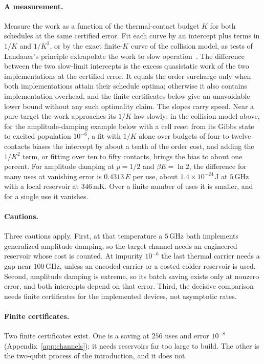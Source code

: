 \paragraph{A measurement.} Measure the work as a function of the thermal-contact budget $K$ for both schedules at the same certified error. Fit each curve by an intercept plus terms in $1/K$ and $1/K^2$, or by the exact finite-$K$ curve of the collision model, as tests of Landauer's principle extrapolate the work to slow operation~\cite{Berut12,Jun14}. The difference between the two slow-limit intercepts is the excess quasistatic work of the two implementations at the certified error. It equals the order surcharge only when both implementations attain their schedule optima; otherwise it also contains implementation overhead, and the finite certificates below give an unavoidable lower bound without any such optimality claim. The slopes carry speed. Near a pure target the work approaches its $1/K$ law slowly: in the collision model above, for the amplitude-damping example below with a cell reset from its Gibbs state to excited population $10^{-6}$, a fit with $1/K$ alone over budgets of four to twelve contacts biases the intercept by about a tenth of the order cost, and adding the $1/K^2$ term, or fitting over ten to fifty contacts, brings the bias to about one percent. For amplitude damping at $p=1/2$ and $\beta E=\ln2$, the difference for many uses at vanishing error is $0.4313\,E$ per use, about $1.4\times10^{-24}$\,J at $5$\,GHz with a local reservoir at $346$\,mK. Over a finite number of uses it is smaller, and for a single use it vanishes.

\paragraph{Cautions.} Three cautions apply. First, at that temperature a $5$\,GHz bath implements generalized amplitude damping, so the target channel needs an engineered reservoir whose cost is counted. At impurity $10^{-6}$ the last thermal carrier needs a gap near $100$\,GHz, unless an encoded carrier or a costed colder reservoir is used. Second, amplitude damping is extreme, so its batch saving exists only at nonzero error, and both intercepts depend on that error. Third, the decisive comparison needs finite certificates for the implemented devices, not asymptotic rates.

\paragraph{Finite certificates.} Two finite certificates exist. One is a saving at $256$ uses and error $10^{-8}$ (Appendix~\ref{app:channels}); it needs reservoirs far too large to build. The other is the two-qubit process of the introduction, and it does not.

